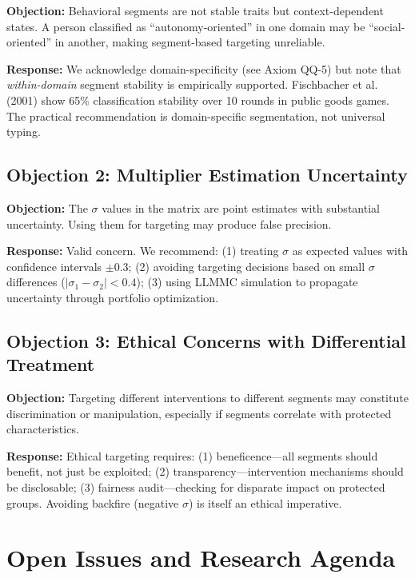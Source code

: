 \textbf{Objection:} Behavioral segments are not stable traits but context-dependent
states. A person classified as ``autonomy-oriented'' in one domain may be
``social-oriented'' in another, making segment-based targeting unreliable.

\textbf{Response:} We acknowledge domain-specificity (see Axiom QQ-5) but note that
\textit{within-domain} segment stability is empirically supported. Fischbacher et al.
(2001) show 65\% classification stability over 10 rounds in public goods games.
The practical recommendation is domain-specific segmentation, not universal typing.

\subsection{Objection 2: Multiplier Estimation Uncertainty}

\textbf{Objection:} The $\sigma$ values in the matrix are point estimates with
substantial uncertainty. Using them for targeting may produce false precision.

\textbf{Response:} Valid concern. We recommend: (1) treating $\sigma$ as expected
values with confidence intervals $\pm 0.3$; (2) avoiding targeting decisions based
on small $\sigma$ differences ($|\sigma_1 - \sigma_2| < 0.4$); (3) using LLMMC
simulation to propagate uncertainty through portfolio optimization.

\subsection{Objection 3: Ethical Concerns with Differential Treatment}

\textbf{Objection:} Targeting different interventions to different segments may
constitute discrimination or manipulation, especially if segments correlate with
protected characteristics.

\textbf{Response:} Ethical targeting requires: (1) beneficence---all segments should
benefit, not just be exploited; (2) transparency---intervention mechanisms should
be disclosable; (3) fairness audit---checking for disparate impact on protected
groups. Avoiding backfire (negative $\sigma$) is itself an ethical imperative.


\section{Open Issues and Research Agenda}
\label{sec:qq-open}

